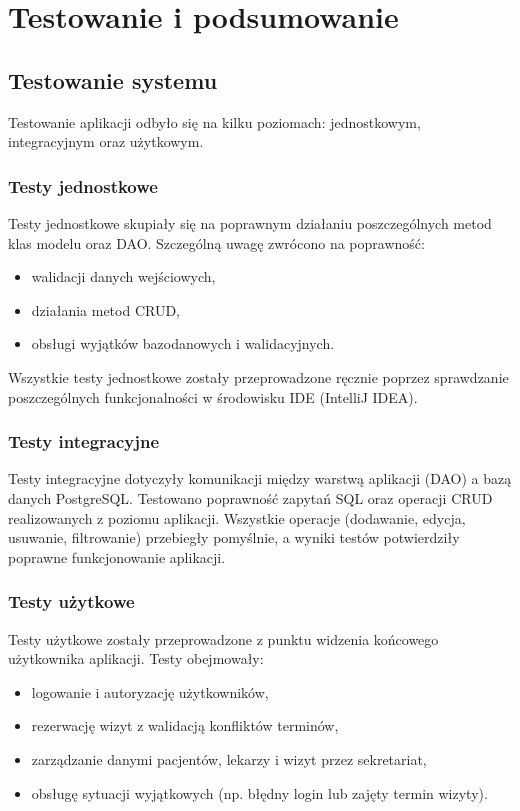 \chapter{Testowanie i podsumowanie}

\section{Testowanie systemu}

Testowanie aplikacji odbyło się na kilku poziomach: jednostkowym, integracyjnym oraz użytkowym.

\subsection{Testy jednostkowe}
Testy jednostkowe skupiały się na poprawnym działaniu poszczególnych metod klas modelu oraz DAO. Szczególną uwagę zwrócono na poprawność:

\begin{itemize}
\item walidacji danych wejściowych,
\item działania metod CRUD,
\item obsługi wyjątków bazodanowych i walidacyjnych.
\end{itemize}

Wszystkie testy jednostkowe zostały przeprowadzone ręcznie poprzez sprawdzanie poszczególnych funkcjonalności w środowisku IDE (IntelliJ IDEA).

\subsection{Testy integracyjne}
Testy integracyjne dotyczyły komunikacji między warstwą aplikacji (DAO) a bazą danych PostgreSQL. Testowano poprawność zapytań SQL oraz operacji CRUD realizowanych z poziomu aplikacji. Wszystkie operacje (dodawanie, edycja, usuwanie, filtrowanie) przebiegły pomyślnie, a wyniki testów potwierdziły poprawne funkcjonowanie aplikacji.

\subsection{Testy użytkowe}
Testy użytkowe zostały przeprowadzone z punktu widzenia końcowego użytkownika aplikacji. Testy obejmowały:

\begin{itemize}
\item logowanie i autoryzację użytkowników,
\item rezerwację wizyt z walidacją konfliktów terminów,
\item zarządzanie danymi pacjentów, lekarzy i wizyt przez sekretariat,
\item obsługę sytuacji wyjątkowych (np. błędny login lub zajęty termin wizyty).
\end{itemize}

